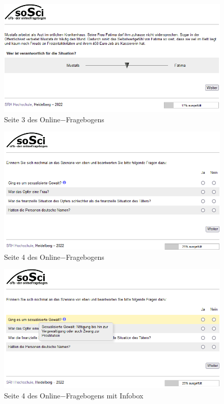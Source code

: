 \begin{appendices}
    \begin{figure}[htb!]
        \centering
            \includegraphics[width=\textwidth]{Seite 3.png}
            \caption[]{Seite 3 des Online$-$Fragebogens}
    \end{figure}
    
    \newpage
    \begin{figure}[htb!]
        \centering
            \includegraphics[width=\textwidth]{Seite 4.png}
            \caption[]{Seite 4 des Online$-$Fragebogens}
    \end{figure}
    
    \begin{figure}[htb!]
        \centering
            \includegraphics[width=\textwidth]{Seite 4 mit Infobox.png}
            \caption[]{Seite 4 des Online$-$Fragebogens mit Infobox}
    \end{figure}
    

\end{appendices}
